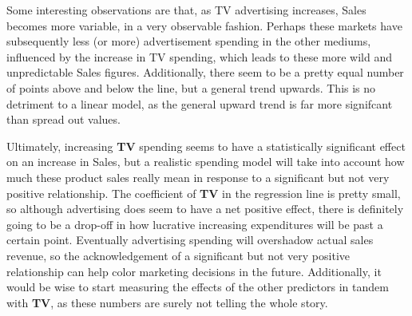 \documentclass{article}
\begin{document}
Some interesting observations are that, as TV advertising increases, Sales becomes more variable, in a very observable fashion. Perhaps these markets have subsequently less (or more) advertisement spending in the other mediums, influenced by the increase in TV spending, which leads to these more wild and unpredictable Sales figures. Additionally, there seem to be a pretty equal number of points above and below the line, but a general trend upwards. This is no detriment to a linear model, as the general upward trend is far more signifcant than spread out values.   


Ultimately, increasing \textbf{TV} spending seems to have a statistically significant effect on an increase in Sales, but a realistic spending model will take into account how much these product sales really mean in response to a significant but not very positive relationship. The coefficient of \textbf{TV} in the regression line is pretty small, so although advertising does seem to have a net positive effect, there is definitely going to be a drop-off in how lucrative increasing expenditures will be past a certain point. Eventually advertising spending will overshadow actual sales revenue, so the acknowledgement of a significant but not very positive relationship can help color marketing decisions in the future. Additionally, it would be wise to start measuring the effects of the other predictors in tandem with \textbf{TV}, as these numbers are surely not telling the whole story.
\end{document}
